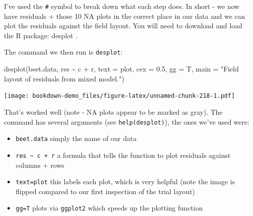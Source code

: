 \documentclass[
]{book}
\newenvironment{Shaded}{\begin{snugshade}}{\end{snugshade}}
\newcommand{\AttributeTok}[1]{\textcolor[rgb]{0.77,0.63,0.00}{#1}}
\newcommand{\CommentTok}[1]{\textcolor[rgb]{0.56,0.35,0.01}{\textit{#1}}}
\newcommand{\ConstantTok}[1]{\textcolor[rgb]{0.00,0.00,0.00}{#1}}
\newcommand{\FloatTok}[1]{\textcolor[rgb]{0.00,0.00,0.81}{#1}}
\newcommand{\FunctionTok}[1]{\textcolor[rgb]{0.00,0.00,0.00}{#1}}
\newcommand{\NormalTok}[1]{#1}
\newcommand{\OtherTok}[1]{\textcolor[rgb]{0.56,0.35,0.01}{#1}}
\newcommand{\SpecialCharTok}[1]{\textcolor[rgb]{0.00,0.00,0.00}{#1}}
\newcommand{\StringTok}[1]{\textcolor[rgb]{0.31,0.60,0.02}{#1}}
\providecommand{\tightlist}{%
  \setlength{\itemsep}{0pt}\setlength{\parskip}{0pt}}
\begin{document}
\begin{Shaded}
\end{Shaded}

I've used the \texttt{\#} symbol to break down what each step does. In short - we now have residuals + those 10 NA plots in the correct place in our data and we can plot the residuals against the field layout. You will need to download and load the R package: desplot \citep{R-desplot}.

The command we then run is \texttt{desplot}:

\begin{Shaded}
\begin{Highlighting}[]
\FunctionTok{desplot}\NormalTok{(beet.data, res }\SpecialCharTok{\textasciitilde{}}\NormalTok{ c }\SpecialCharTok{+}\NormalTok{ r, }\AttributeTok{text =}\NormalTok{ plot, }\AttributeTok{cex =} \FloatTok{0.5}\NormalTok{, }\AttributeTok{gg =}\NormalTok{ T, }
    \AttributeTok{main =} \StringTok{"Field layout of residuals from mixed model."}\NormalTok{)}
\end{Highlighting}
\end{Shaded}

\texttt{[image: bookdown-demo\_files/figure-latex/unnamed-chunk-218-1.pdf]}

That's worked well (note - NA plots appear to be marked as gray). The command has several arguments (see \texttt{help(desplot)}), the ones we've used were:

\begin{itemize}
\tightlist
\item
  \texttt{beet.data} simply the name of our data
\item
  \texttt{res\ \textasciitilde{}\ c\ +\ r} a formula that tells the function to plot residuals against columns + rows
\item
  \texttt{text=plot} this labels each plot, which is very helpful (note the image is flipped compared to our first inspection of the trial layout)
\item
  \texttt{gg=T} plots via \texttt{ggplot2} which speeds up the plotting function
\end{itemize}
\end{document}
